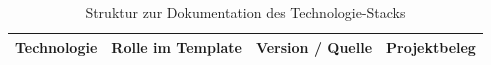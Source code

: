 \begin{table}[H]
  \centering
  \small
  \renewcommand{\arraystretch}{1.2}
  \caption{Struktur zur Dokumentation des Technologie-Stacks}
  \label{tab:technology-stack}
  \begin{tabularx}{\textwidth}{@{}p{}p{}p{}>{\raggedright\arraybackslash}X@{}}
    \toprule
    \textbf{Technologie} & \textbf{Rolle im Template} & \textbf{Version / Quelle} & \textbf{Projektbeleg} \\
    \midrule
    \bottomrule
  \end{tabularx}
\end{table}
